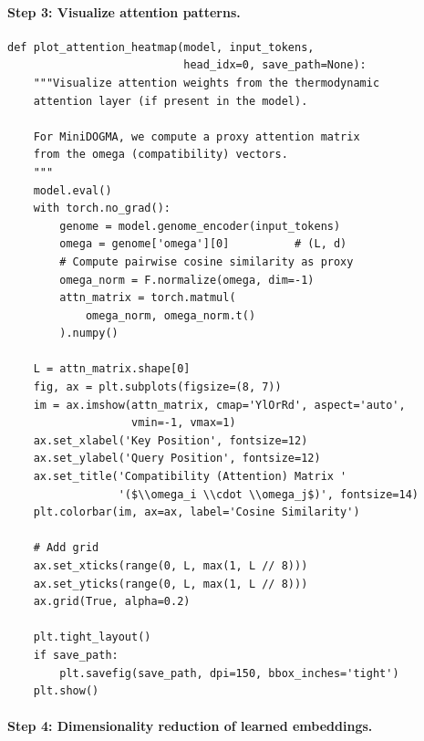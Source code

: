 \paragraph{Step 3: Visualize attention patterns.}

\begin{lstlisting}[style=dogmapython, caption={Lab 8: Attention pattern visualization.}]
def plot_attention_heatmap(model, input_tokens,
                           head_idx=0, save_path=None):
    """Visualize attention weights from the thermodynamic
    attention layer (if present in the model).

    For MiniDOGMA, we compute a proxy attention matrix
    from the omega (compatibility) vectors.
    """
    model.eval()
    with torch.no_grad():
        genome = model.genome_encoder(input_tokens)
        omega = genome['omega'][0]          # (L, d)
        # Compute pairwise cosine similarity as proxy
        omega_norm = F.normalize(omega, dim=-1)
        attn_matrix = torch.matmul(
            omega_norm, omega_norm.t()
        ).numpy()

    L = attn_matrix.shape[0]
    fig, ax = plt.subplots(figsize=(8, 7))
    im = ax.imshow(attn_matrix, cmap='YlOrRd', aspect='auto',
                   vmin=-1, vmax=1)
    ax.set_xlabel('Key Position', fontsize=12)
    ax.set_ylabel('Query Position', fontsize=12)
    ax.set_title('Compatibility (Attention) Matrix '
                 '($\\omega_i \\cdot \\omega_j$)', fontsize=14)
    plt.colorbar(im, ax=ax, label='Cosine Similarity')

    # Add grid
    ax.set_xticks(range(0, L, max(1, L // 8)))
    ax.set_yticks(range(0, L, max(1, L // 8)))
    ax.grid(True, alpha=0.2)

    plt.tight_layout()
    if save_path:
        plt.savefig(save_path, dpi=150, bbox_inches='tight')
    plt.show()
\end{lstlisting}

\paragraph{Step 4: Dimensionality reduction of learned embeddings.}

